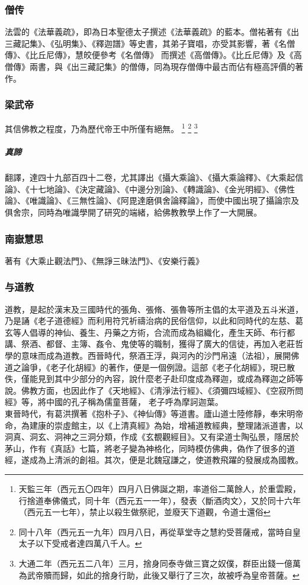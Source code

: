 \subsubsection{僧传}
法雲的《法華義疏》，即為日本聖德太子撰述《法華義疏》的藍本。僧祐著有《出三藏記集》、《弘明集》、《釋迦譜》等史書，其弟子寶唱，亦受其影響，著《名僧傳》、《比丘尼傳》，慧皎便參考《名僧傳》
而撰述《高僧傳》。《比丘尼傳》及《高僧傳》兩書，與《出三藏記集》的僧傳，同為現存僧傳中最古而佔有極高評價的著作。
\subsubsection{梁武帝}
其信佛教之程度，乃為歷代帝王中所僅有絕無。
\footnote{天監三年（西元五〇四年）四月八日佛誕之期，率道俗二萬餘人，於重雲殿，行捨道奉佛儀式，同十年（西元五一一年），發表〈斷酒肉文〉，又於同十六年（西元五一七年），禁止以殺生做祭祀，並廢天下道觀，令道士還俗}
\footnote{同十八年（西元五一九年）四月八日，再從草堂寺之慧約受菩薩戒，當時自皇太子以下受戒者達四萬八千人。}
\footnote{大通二年（西元五二八年）三月，捨身同泰寺做三寶之奴僕，群臣出錢一億萬為武帝贖而歸，如此的捨身行助，此後又舉行了三次，故被呼為皇帝菩薩。}

\subparagraph{真諦}
翻譯，達四十九部百四十二卷，尤其譯出《攝大乘論》、《攝大乘論釋》、《大乘起信論》、《十七地論》、《決定藏論》、《中邊分別論》、《轉識論》、《金光明經》、《佛性論》、《唯識論》、《三無性論》、《阿毘達磨俱舍論釋論》，而使中國出現了攝論宗及俱舍宗，同時為唯識學開了研究的端緒，給佛教教學上作了一大開展。

\subsubsection{南嶽慧思}
著有《大乘止觀法門》、《無諍三昧法門》、《安樂行義》

\subsubsection{与道教}
道教，是起於漢末及三國時代的張角、張脩、張魯等所主倡的太平道及五斗米道，乃是誦《老子道德經》而利用符咒祈禱治病的民俗信仰，以此和同時代的左慈、葛玄等人倡導的神仙、養生、丹藥之方術，合流而成為組織化，產生天師、布行都講、祭酒、都督、主簿、姦令、鬼使等的職制，獲得了廣大的信徒，再加入老莊哲學的意味而成為道教。西晉時代，祭酒王浮，與河內的沙門帛遠（法祖），展開佛道之論爭，《老子化胡經》的著作，便是一個例證。這部《老子化胡經》，現已散佚，僅能見到其中少部分的內容，說什麼老子赴印度成為釋迦，或成為釋迦之師等說。佛教方面，也因此作了《天地經》、《清淨法行經》、《須彌四域經》、《空寂所問經》等，將中國的孔子稱為儒童菩薩， 老子呼為摩訶迦葉。
\\
東晉時代，有葛洪撰著《抱朴子》、《神仙傳》等道書。廬山道士陸修靜，奉宋明帝命，為建康的崇虛館主，以《上清真經》為始，增補道教經典，整理諸派道書，以洞真、洞玄、洞神之三洞分類，作成《玄覩觀經目》。又有梁道士陶弘景，隱居於茅山，作有《真話》七篇，將老子變為神格化，同時模仿佛典，偽作了很多的道經，遂成為上清派的創祖。其次，便是北魏寇謙之，使道教飛躍的發展成為國教。

